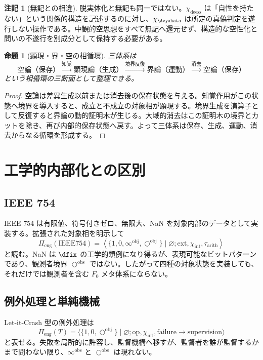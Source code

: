 \documentclass[a4paper,11pt]{ltjsarticle}
\theoremstyle{definition}
\newtheorem{remark}[definition]{注記}
\theoremstyle{plain}
\newtheorem{proposition}[definition]{命題}
\newcommand{\Phase}{\Pi}
\newcommand{\oobs}{\bigcirc^{\mathrm{obs}}}
\newcommand{\oobj}{\bigcirc^{\mathrm{obj}}}
\newcommand{\iobs}{\infty^{\mathrm{obs}}}
\newcommand{\iobj}{\infty^{\mathrm{obj}}}
\begin{document}
\begin{remark}[無記との相違]
脱実体化と無記も同一ではない。$\chi_{\mathrm{deess}}$ は「自性を持たない」という関係的構造を記述するのに対し、$\chi_{\Avyakata}$ は所定の真偽判定を遂行しない操作である。中観的空思想をすべて無記へ還元せず、構造的な空性化と問いの不遂行を別成分として保持する必要がある。
\end{remark}

\begin{proposition}[顕現・界・空の相循環]
三体系は
\[
 \boxed{
 \text{空論（保存）}
 \xrightarrow{\text{知覚}}
 \text{顕現論（生成）}
 \xrightarrow{\text{境界反復}}
 \text{界論（運動）}
 \xrightarrow{\text{消去}}
 \text{空論（保存）}}
\]
という相循環の三断面として整理できる。
\end{proposition}

\begin{proof}
空論は差異生成以前または消去後の保存状態を与える。知覚作用がこの状態へ境界を導入すると、成立と不成立の対象相が顕現する。境界生成を演算子として反復すると界論の動的証明木が生じる。大域的消去はこの証明木の境界とカットを除き、再び内部的保存状態へ戻す。よって三体系は保存、生成、運動、消去からなる循環を形成する。
\end{proof}

\section{工学的内部化との区別}

\subsection{IEEE 754}

IEEE 754 は有限値、符号付きゼロ、無限大、NaN を対象内部のデータとして実装する。拡張された対象相を明示して
\[
 \Phase_{\mathrm{eng}}(\mathrm{IEEE754})
 =
 \left\langle
 \{1,0,\iobj,\oobj\}\mid\varnothing;
 \mathrm{ext},\chi_{\mathrm{int}},\tau_{\mathrm{arith}}
 \right\rangle
\]
と読む。NaN は $\dfix$ の工学的類例になり得るが、表現可能なビットパターンであり、観測者境界 $\oobs$ ではない。したがって四種の対象状態を実装しても、それだけでは観測者を含む $F_0$ メタ体系にならない。

\subsection{例外処理と単純機械}

Let-it-Crash 型の例外処理は
\[
 \Phase_{\mathrm{eng}}(T)
 =
 \langle\{1,0,\oobj\}\mid\varnothing;
 \mathrm{op},\chi_{\mathrm{int}},
 \mathrm{failure}\to\mathrm{supervision}\rangle
\]
と表せる。失敗を局所的に許容し、監督機構へ移すが、監督者を誰が監督するかまで問わない限り、$\iobs$ と $\oobs$ は現れない。
\end{document}
